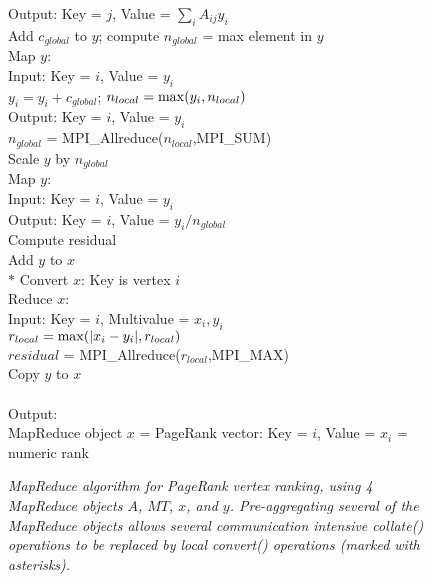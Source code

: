 \begin{figure}[htb]
\begin{center}
{\begin{minipage}{\textwidth}
\begin{tabbing}
\> \> \> Output: Key = $j$, Value = $\sum_i A_{ij} y_i$ \\
 Add $c_{global}$ to $y$; compute $n_{global}$ = max element in $y$ \\
\> \> Map $y$:  \\
\> \> \> Input: Key = $i$, Value = $y_i$ \\
\> \> \> $y_i = y_i + c_{global}$; $n_{local} = {\rm max}(y_i,n_{local})$ \\
\> \> \> Output:  Key = $i$, Value = $y_i$ \\
\> \> $n_{global}$ = MPI\_Allreduce($n_{local}$,MPI\_SUM) \\
 Scale $y$ by $n_{global}$ \\
\> \> Map $y$: \\
\> \> \> Input:  Key = $i$, Value = $y_i$ \\
\> \> \> Output:  Key = $i$, Value = $y_i / {n_{global}}$ \\
 Compute residual \\
\> \> Add $y$ to $x$ \\
$*$\> \> Convert $x$:  Key is vertex $i$ \\
\> \> Reduce $x$:  \\
\> \> \> Input: Key = $i$, Multivalue = $x_i, y_i$ \\
\> \> \> $r_{local} = {\rm max}(|x_i - y_i|,r_{local})$ \\
\> \> $residual$ = MPI\_Allreduce($r_{local}$,MPI\_MAX) \\
 Copy $y$ to $x$ \\
\\
Output: \\
\> MapReduce object $x$ = PageRank vector: Key = $i$, Value = $x_i$ = numeric rank \\

  \end{tabbing}
 \end{minipage}}\end{center}

 \caption{\it MapReduce algorithm for PageRank vertex ranking, using 4
 MapReduce objects $A$, $MT$, $x$, and $y$.  Pre-aggregating several
 of the MapReduce objects allows several communication intensive {\it
 collate()} operations to be replaced by local {\it convert()}
 operations (marked with asterisks).}

 \label{fig:pr2}
\end{figure}

